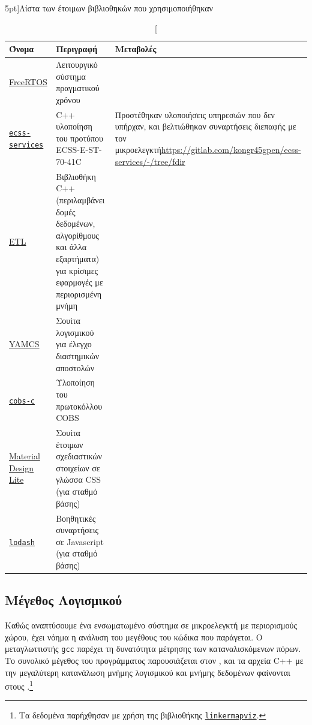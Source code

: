 \documentclass[a4paper,nobib]{tufte-book}
\begin{document}
\begin{table}[h]
	\centering
	\vspace{2em}
	\caption[][5pt]{Λίστα των έτοιμων βιβλιοθηκών που χρησιμοποιήθηκαν}
	\label{tab:old_software}
	\begin{tabularx}{\textwidth}{@{}lp{6cm}X@{}}
		\toprule
		Όνομα & Περιγραφή & Μεταβολές \\ \midrule
		\href{https://www.freertos.org/}{FreeRTOS} & Λειτουργικό σύστημα πραγματικού χρόνου & \\
		\href{https://gitlab.com/acubesat/obc/ecss-services}{\texttt{ecss-services}} & C++ υλοποίηση του προτύπου ECSS-E-ST-70-41C %
		& \small
		Προστέθηκαν υλοποιήσεις υπηρεσιών που δεν υπήρχαν, και βελτιώθηκαν συναρτήσεις διεπαφής με τον μικροελεγκτή\newline\small\url{https://gitlab.com/kongr45gpen/ecss-services/-/tree/fdir}
		 \\
		 \href{https://www.etlcpp.com/}{\acs{ETL}}  & Βιβλιοθήκη C++ (περιλαμβάνει δομές δεδομένων, αλγορίθμους και άλλα εξαρτήματα) για κρίσιμες εφαρμογές με περιορισμένη μνήμη &
		 \\
 		\href{https://github.com/yamcs/yamcs}{\acs{YAMCS}}  & Σουίτα λογισμικού για έλεγχο διαστημικών αποστολών& %
 		\\
		\href{https://github.com/cmcqueen/cobs-c}{\texttt{cobs-c}}  & Υλοποίηση του πρωτοκόλλου \ac{COBS} %
		 & \\
		 \href{https://getmdl.io/}{Material Design Lite}  & Σουίτα έτοιμων σχεδιαστικών στοιχείων σε γλώσσα CSS (για σταθμό βάσης)
		 & \\
		 \href{https://lodash.com/}{\texttt{lodash}}  & Βοηθητικές συναρτήσεις σε Javascript (για σταθμό βάσης)
		 & \\
		\bottomrule
	\end{tabularx}
\end{table}

\FloatBarrier
\subsection{Μέγεθος Λογισμικού}
Καθώς αναπτύσουμε ένα ενσωματωμένο σύστημα σε μικροελεγκτή με περιορισμούς χώρου, έχει νόημα η ανάλυση του μεγέθους του κώδικα που παράγεται. Ο μεταγλωττιστής \texttt{gcc} παρέχει τη δυνατότητα μέτρησης των καταναλισκόμενων πόρων. Το συνολικό μέγεθος του προγράμματος παρουσιάζεται στον , και τα αρχεία C++ με την μεγαλύτερη κατανάλωση μνήμης λογισμικού και μνήμης δεδομένων φαίνονται στους .\footnote{Τα δεδομένα παρήχθησαν με χρήση της βιβλιοθήκης \href{https://github.com/PromyLOPh/linkermapviz}{\texttt{linkermapviz}}.}
\end{document}
